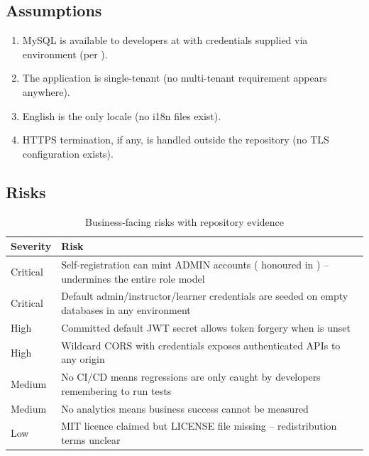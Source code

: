 \subsection{Assumptions}

\begin{enumerate}
    \item MySQL is available to developers at  with credentials supplied via environment (per ).
    \item The application is single-tenant (no multi-tenant requirement appears anywhere).
    \item English is the only locale (no i18n files exist).
    \item HTTPS termination, if any, is handled outside the repository (no TLS configuration exists).
\end{enumerate}

\subsection{Risks}

\begin{table}[H]
\centering
\caption{Business-facing risks with repository evidence}
\label{tab:brd-risks}
\begin{tabular}{@{}C{1.6cm}L{12.2cm}@{}}
\toprule
\textbf{Severity} & \textbf{Risk} \\
\midrule
Critical & Self-registration can mint ADMIN accounts ( honoured in ) -- undermines the entire role model \\
Critical & Default admin/instructor/learner credentials are seeded on empty databases in any environment \\
High & Committed default JWT secret allows token forgery when  is unset \\
High & Wildcard CORS with credentials exposes authenticated APIs to any origin \\
Medium & No CI/CD means regressions are only caught by developers remembering to run tests \\
Medium & No analytics means business success cannot be measured \\
Low & MIT licence claimed but LICENSE file missing -- redistribution terms unclear \\
\bottomrule
\end{tabular}
\end{table}

